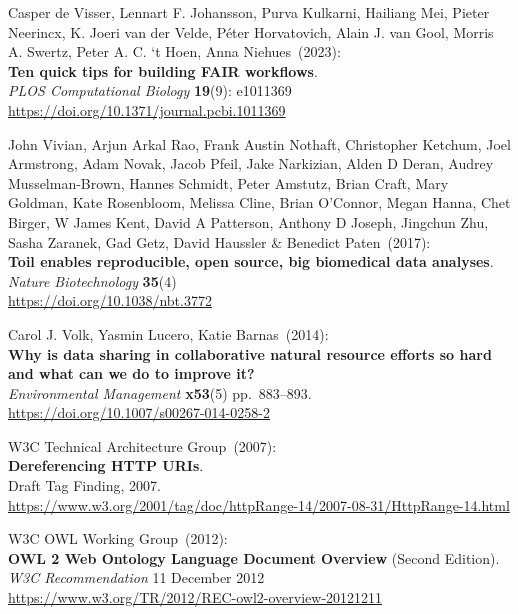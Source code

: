 \begin{thebibliography}{9}
Casper de Visser, Lennart F. Johansson, Purva Kulkarni, Hailiang Mei, Pieter Neerincx, K. Joeri van der Velde, Péter Horvatovich, Alain J. van Gool, Morris A. Swertz, Peter A. C. ‘t Hoen, Anna Niehues~(2023):\\
\textbf{Ten quick tips for building FAIR workflows}.\\
\emph{PLOS Computational Biology} \textbf{19}(9): e1011369\\
\url{https://doi.org/10.1371/journal.pcbi.1011369}

John Vivian, Arjun Arkal Rao, Frank Austin Nothaft, Christopher
Ketchum, Joel Armstrong, Adam Novak, Jacob Pfeil, Jake Narkizian, Alden
D Deran, Audrey Musselman-Brown, Hannes Schmidt, Peter Amstutz, Brian
Craft, Mary Goldman, Kate Rosenbloom, Melissa Cline, Brian O'Connor,
Megan Hanna, Chet Birger, W James Kent, David A Patterson, Anthony D
Joseph, Jingchun Zhu, Sasha Zaranek, Gad Getz, David Haussler \&
Benedict Paten~(2017): \\
\textbf{Toil enables reproducible, open source, big biomedical data
analyses}.\\
\emph{Nature Biotechnology} \textbf{35}(4)\\
\url{https://doi.org/10.1038/nbt.3772}

Carol J. Volk, Yasmin Lucero, Katie Barnas~(2014): \\
\textbf{Why is data sharing in collaborative natural resource efforts so
hard and what can we do to improve it?}\\
\emph{Environmental Management} \textbf{x53}(5) pp.~883--893.\\
\url{https://doi.org/10.1007/s00267-014-0258-2}

W3C Technical Architecture Group~(2007): \\
\textbf{Dereferencing HTTP URIs}.\\
Draft Tag Finding, 2007.\\
\url{https://www.w3.org/2001/tag/doc/httpRange-14/2007-08-31/HttpRange-14.html}

W3C OWL Working Group~(2012): \\
\textbf{{OWL} 2 {Web Ontology Language Document Overview}} ({Second Edition}). \\
\emph{W3C Recommendation} 11 December 2012 \\
\url{https://www.w3.org/TR/2012/REC-owl2-overview-20121211} 


\end{thebibliography}
